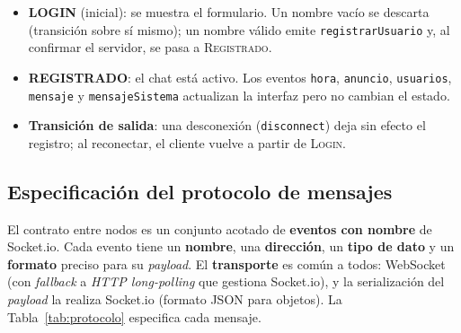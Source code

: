 \documentclass[12pt,a4paper]{article}
\begin{document}
\begin{itemize}[leftmargin=1.4em]
    \item \textbf{LOGIN} (inicial): se muestra el formulario. Un nombre vacío se descarta (transición sobre sí mismo); un nombre válido emite \texttt{registrarUsuario} y, al confirmar el servidor, se pasa a \textsc{Registrado}.
    \item \textbf{REGISTRADO}: el chat está activo. Los eventos \texttt{hora}, \texttt{anuncio}, \texttt{usuarios}, \texttt{mensaje} y \texttt{mensajeSistema} actualizan la interfaz pero no cambian el estado.
    \item \textbf{Transición de salida}: una desconexión (\texttt{disconnect}) deja sin efecto el registro; al reconectar, el cliente vuelve a partir de \textsc{Login}.
\end{itemize}

\subsection{Especificación del protocolo de mensajes}
\label{sec:protocolo}

El contrato entre nodos es un conjunto acotado de \textbf{eventos con nombre} de Socket.io. Cada evento tiene un \textbf{nombre}, una \textbf{dirección}, un \textbf{tipo de dato} y un \textbf{formato} preciso para su \textit{payload}. El \textbf{transporte} es común a todos: WebSocket (con \textit{fallback} a \textit{HTTP long-polling} que gestiona Socket.io), y la serialización del \textit{payload} la realiza Socket.io (formato JSON para objetos). La Tabla~\ref{tab:protocolo} especifica cada mensaje.
\end{document}
